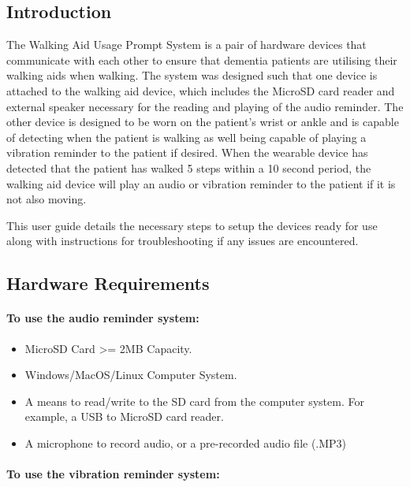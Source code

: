 		\subsection{Introduction}

			The Walking Aid Usage Prompt System is a pair of hardware devices that communicate with each other to ensure that dementia patients are utilising their walking aids when walking. The system was designed such that one device is attached to the walking aid device, which includes the MicroSD card reader and external speaker necessary for the reading and playing of the audio reminder. The other device is designed to be worn on the patient's wrist or ankle and is capable of detecting when the patient is walking as well being capable of playing a vibration reminder to the patient if desired. When the wearable device has detected that the patient has walked 5 steps within a 10 second period, the walking aid device will play an audio or vibration reminder to the patient if it is not also moving. 

			This user guide details the necessary steps to setup the devices ready for use along with instructions for troubleshooting if any issues are encountered.

		\subsection{Hardware Requirements}
		\label{subsec:hardware_reqs}

			\paragraph{To use the audio reminder system:}\mbox{}

			\begin{itemize}
				\item MicroSD Card >= 2MB Capacity.
				\item Windows/MacOS/Linux Computer System.
				\item A means to read/write to the SD card from the computer system. For example, a USB to MicroSD card reader.
				\item A microphone to record audio, or a pre-recorded audio file (.MP3)
			\end{itemize}

			\paragraph{To use the vibration reminder system:}\mbox{}

